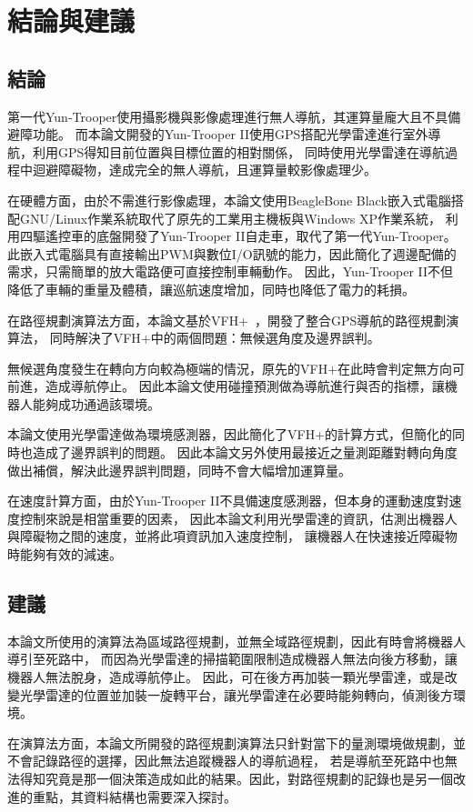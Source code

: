 \chapter{結論與建議}
\section{結論}
第一代Yun-Trooper使用攝影機與影像處理進行無人導航，其運算量龐大且不具備避障功能。
而本論文開發的Yun-Trooper II使用GPS搭配光學雷達進行室外導航，利用GPS得知目前位置與目標位置的相對關係，
同時使用光學雷達在導航過程中迴避障礙物，達成完全的無人導航，且運算量較影像處理少。

在硬體方面，由於不需進行影像處理，本論文使用BeagleBone Black嵌入式電腦搭配GNU/Linux作業系統取代了原先的工業用主機板與Windows XP作業系統，
利用四驅遙控車的底盤開發了Yun-Trooper II自走車，取代了第一代Yun-Trooper。
此嵌入式電腦具有直接輸出PWM與數位I/O訊號的能力，因此簡化了週邊配備的需求，只需簡單的放大電路便可直接控制車輛動作。
因此，Yun-Trooper II不但降低了車輛的重量及體積，讓巡航速度增加，同時也降低了電力的耗損。

在路徑規劃演算法方面，本論文基於VFH+~\cite{Ulrich:1998:VFHPlus}，開發了整合GPS導航的路徑規劃演算法，
同時解決了VFH+中的兩個問題：無候選角度及邊界誤判。

無候選角度發生在轉向方向較為極端的情況，原先的VFH+在此時會判定無方向可前進，造成導航停止。
因此本論文使用碰撞預測做為導航進行與否的指標，讓機器人能夠成功通過該環境。

本論文使用光學雷達做為環境感測器，因此簡化了VFH+的計算方式，但簡化的同時也造成了邊界誤判的問題。
因此本論文另外使用最接近之量測距離對轉向角度做出補償，解決此邊界誤判問題，同時不會大幅增加運算量。

在速度計算方面，由於Yun-Trooper II不具備速度感測器，但本身的運動速度對速度控制來說是相當重要的因素，
因此本論文利用光學雷達的資訊，估測出機器人與障礙物之間的速度，並將此項資訊加入速度控制，
讓機器人在快速接近障礙物時能夠有效的減速。

\section{建議}
本論文所使用的演算法為區域路徑規劃，並無全域路徑規劃，因此有時會將機器人導引至死路中，
而因為光學雷達的掃描範圍限制造成機器人無法向後方移動，讓機器人無法脫身，造成導航停止。
因此，可在後方再加裝一顆光學雷達，或是改變光學雷達的位置並加裝一旋轉平台，讓光學雷達在必要時能夠轉向，偵測後方環境。

在演算法方面，本論文所開發的路徑規劃演算法只針對當下的量測環境做規劃，並不會記錄路徑的選擇，因此無法追蹤機器人的導航過程，
若是導航至死路中也無法得知究竟是那一個決策造成如此的結果。因此，對路徑規劃的記錄也是另一個改進的重點，其資料結構也需要深入探討。

